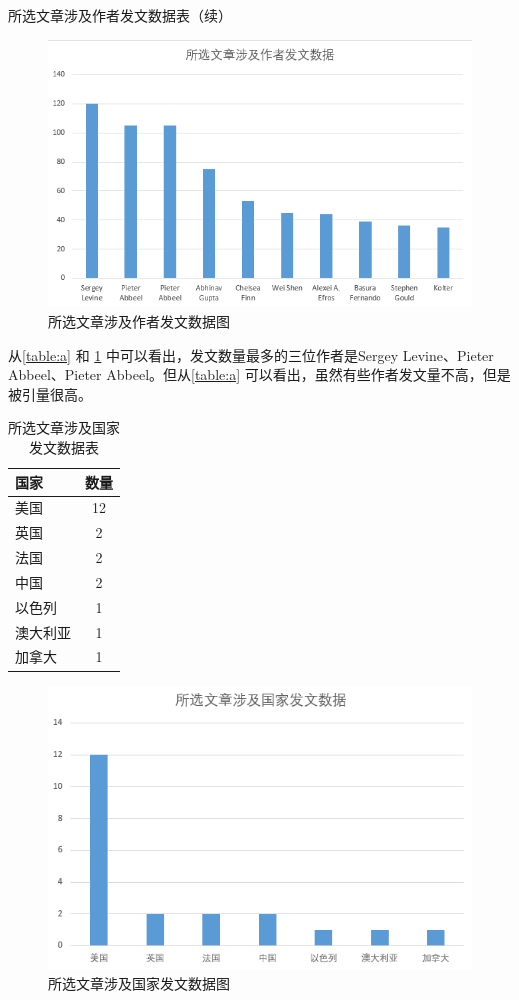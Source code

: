 \begin{table}[htbp]
    \caption{所选文章涉及作者发文数据表（续）}
\end{table}


\begin{figure}[htbp]
    \centering
    \includegraphics[width=.7\linewidth]{figure/fa.png}
    \caption{所选文章涉及作者发文数据图}
    \label{fig:fa}
\end{figure}

从\ref{table:a} 和 \ref{fig:fa} 中可以看出，发文数量最多的三位作者是Sergey Levine、Pieter Abbeel、Pieter Abbeel。但从\ref{table:a}
可以看出，虽然有些作者发文量不高，但是被引量很高。


\begin{table}[htbp]
    \centering
    \begin{tabular}{lc}
    \hline
    \textbf{国家} & \multicolumn{1}{l}{\textbf{数量}} \\ \hline
    美国          & 12                              \\
    英国          & 2                               \\
    法国          & 2                               \\
    中国          & 2                               \\
    以色列         & 1                               \\
    澳大利亚        & 1                               \\
    加拿大         & 1                               \\ \hline
    \end{tabular}
    \caption{所选文章涉及国家发文数据表}
    \label{table:b}
\end{table}

\begin{figure}[htbp]
    \centering
    \includegraphics[width=.7\linewidth]{figure/fb.png}
    \caption{所选文章涉及国家发文数据图}
    \label{fig:fb}
\end{figure}

